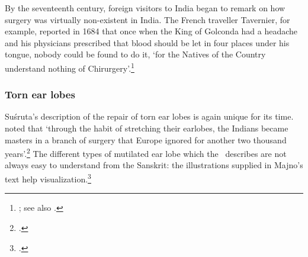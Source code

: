 By the seventeenth century, foreign visitors to India began to remark on how
surgery was virtually non-existent in India. The French traveller
Tavernier\label{tavernier}, for example, reported in 1684 that once when the
King of Golconda had a headache and his physicians prescribed that
blood should be let in four places under his tongue, nobody could be found
to do it, `for the Natives of the Country understand nothing of
Chirurgery'.\footnote{\cite[1.2.103]{tave-trav}; see also
\cite[1.130]{slee-ramb}.}


\subsubsection{Torn ear lobes}

Suśruta's description of the repair of torn ear lobes is again unique for
its time.  \citeauthor{majn-1975} noted that `through the habit of
stretching their earlobes, the Indians became masters in a branch of surgery
that Europe ignored for another two thousand years'.\footcite[291]{majn-1975}  
The different types of
mutilated ear lobe which the \SS\ describes are not always easy to understand
from the Sanskrit: the illustrations supplied in Majno's text help
visualization.\footcites[290--291]{majn-1975}[reproduced with permission 
in][92--93]{wuja-2003}



